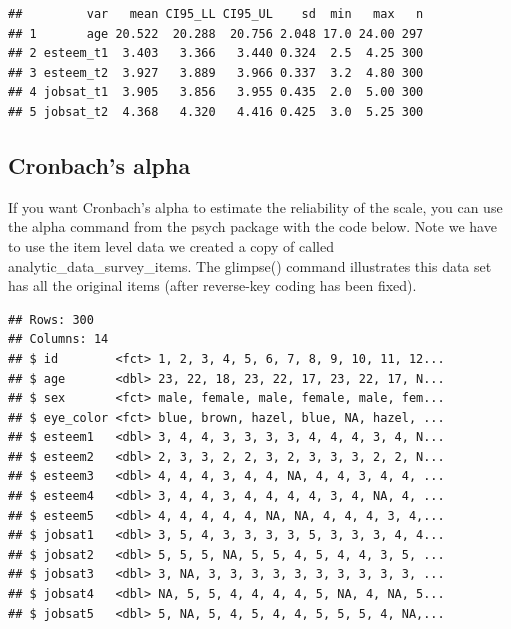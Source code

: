\documentclass[
]{krantz}
\makeatletter
\newenvironment{Shaded}{\begin{snugshade}}{\end{snugshade}}
\newcommand{\KeywordTok}[1]{\textcolor[rgb]{0.27,0.27,0.27}{\textbf{#1}}}
\newcommand{\NormalTok}[1]{#1}
\newcommand{\OperatorTok}[1]{\textcolor[rgb]{0.43,0.43,0.43}{\textbf{#1}}}
\newcommand{\StringTok}[1]{\textcolor[rgb]{0.5,0.5,0.5}{#1}}
\newenvironment{kframe}{%
\medskip{}
\setlength{\fboxsep}{.8em}
 \def\at@end@of@kframe{}%
 \ifinner\ifhmode%
  \def\at@end@of@kframe{\end{minipage}}%
  \begin{minipage}{\columnwidth}%
 \fi\fi%
 \def\FrameCommand##1{\hskip\@totalleftmargin \hskip-\fboxsep
 \colorbox{shadecolor}{##1}\hskip-\fboxsep
     \hskip-\linewidth \hskip-\@totalleftmargin \hskip\columnwidth}%
 \MakeFramed {\advance\hsize-\width
   \@totalleftmargin\z@ \linewidth\hsize
   \@setminipage}}%
 {\par\unskip\endMakeFramed%
 \at@end@of@kframe}
\renewenvironment{Shaded}{\begin{kframe}}{\end{kframe}}
\makeatother
\begin{document}
\begin{verbatim}
##         var   mean CI95_LL CI95_UL    sd  min   max   n
## 1       age 20.522  20.288  20.756 2.048 17.0 24.00 297
## 2 esteem_t1  3.403   3.366   3.440 0.324  2.5  4.25 300
## 3 esteem_t2  3.927   3.889   3.966 0.337  3.2  4.80 300
## 4 jobsat_t1  3.905   3.856   3.955 0.435  2.0  5.00 300
## 5 jobsat_t2  4.368   4.320   4.416 0.425  3.0  5.25 300
\end{verbatim}

\hypertarget{cronbachs-alpha}{%
\subsection{Cronbach's alpha}\label{cronbachs-alpha}}

If you want Cronbach's alpha to estimate the reliability of the scale, you can use the alpha command from the psych package with the code below. Note we have to use the item level data we created a copy of called analytic\_data\_survey\_items. The glimpse() command illustrates this data set has all the original items (after reverse-key coding has been fixed).

\begin{Shaded}
\end{Shaded}

\begin{verbatim}
## Rows: 300
## Columns: 14
## $ id        <fct> 1, 2, 3, 4, 5, 6, 7, 8, 9, 10, 11, 12...
## $ age       <dbl> 23, 22, 18, 23, 22, 17, 23, 22, 17, N...
## $ sex       <fct> male, female, male, female, male, fem...
## $ eye_color <fct> blue, brown, hazel, blue, NA, hazel, ...
## $ esteem1   <dbl> 3, 4, 4, 3, 3, 3, 3, 4, 4, 4, 3, 4, N...
## $ esteem2   <dbl> 2, 3, 3, 2, 2, 3, 2, 3, 3, 3, 2, 2, N...
## $ esteem3   <dbl> 4, 4, 4, 3, 4, 4, NA, 4, 4, 3, 4, 4, ...
## $ esteem4   <dbl> 3, 4, 4, 3, 4, 4, 4, 4, 3, 4, NA, 4, ...
## $ esteem5   <dbl> 4, 4, 4, 4, 4, NA, NA, 4, 4, 4, 3, 4,...
## $ jobsat1   <dbl> 3, 5, 4, 3, 3, 3, 3, 5, 3, 3, 3, 4, 4...
## $ jobsat2   <dbl> 5, 5, 5, NA, 5, 5, 4, 5, 4, 4, 3, 5, ...
## $ jobsat3   <dbl> 3, NA, 3, 3, 3, 3, 3, 3, 3, 3, 3, 3, ...
## $ jobsat4   <dbl> NA, 5, 5, 4, 4, 4, 4, 5, NA, 4, NA, 5...
## $ jobsat5   <dbl> 5, NA, 5, 4, 5, 4, 4, 5, 5, 5, 4, NA,...
\end{verbatim}
\end{document}
